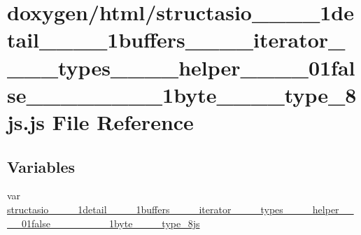 \hypertarget{structasio____1____1detail____1____1buffers________iterator________types________helper____3____0b6bb121a61d701ea1975694184acbe2f}{}\section{doxygen/html/structasio\+\_\+\+\_\+\_\+\+\_\+1detail\+\_\+\+\_\+\_\+\+\_\+1buffers\+\_\+\+\_\+\+\_\+\+\_\+iterator\+\_\+\+\_\+\+\_\+\+\_\+types\+\_\+\+\_\+\+\_\+\+\_\+helper\+\_\+\+\_\+\_\+\+\_\+01false\+\_\+\+\_\+\_\+\+\_\+\_\+\+\_\+\_\+\+\_\+1byte\+\_\+\+\_\+\+\_\+\+\_\+type\+\_\+8js.js File Reference}
\label{structasio____1____1detail____1____1buffers________iterator________types________helper____3____0b6bb121a61d701ea1975694184acbe2f}
\subsection*{Variables}
\begin{DoxyCompactItemize}
\item 
var \hyperlink{structasio____1____1detail____1____1buffers________iterator________types________helper____3____0b6bb121a61d701ea1975694184acbe2f_a21129bac6bf427271e57b3ed111734b4}{structasio\+\_\+\+\_\+\_\+\+\_\+1detail\+\_\+\+\_\+\_\+\+\_\+1buffers\+\_\+\+\_\+\+\_\+\+\_\+iterator\+\_\+\+\_\+\+\_\+\+\_\+types\+\_\+\+\_\+\+\_\+\+\_\+helper\+\_\+\+\_\+\_\+\+\_\+01false\+\_\+\+\_\+\_\+\+\_\+\_\+\+\_\+\_\+\+\_\+1byte\+\_\+\+\_\+\+\_\+\+\_\+type\+\_\+8js}
\end{DoxyCompactItemize}


